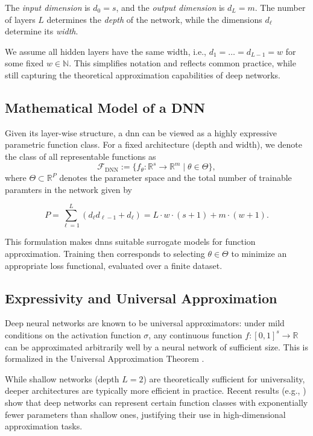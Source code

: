The \emph{input dimension} is $d_0 = s$, and the \emph{output dimension} is $d_L
= m$. The number of layers $L$ determines the \emph{depth} of the network, while
the dimensions $d_\ell$ determine its \emph{width}.

\begin{remark}
We assume all hidden layers have the same width, i.e., $d_1 = \dots = d_{L-1} =
w$ for some fixed $w \in \mathbb{N}$. This simplifies notation and reflects
common practice, while still capturing the theoretical approximation
capabilities of deep networks.
\end{remark}


\subsection{Mathematical Model of a DNN}
\label{subsec:dnn-model}

Given its layer-wise structure, a  \ac{dnn} can be viewed as a highly expressive parametric function class. For a fixed architecture (depth and width), we denote the class of all representable functions as
\begin{equation*}
    \mathcal{F}_{\mathrm{DNN}} := \{ f_\theta : \mathbb{R}^s \to \mathbb{R}^m \mid \theta \in \Theta \},
\end{equation*}
where $\Theta \subset \mathbb{R}^P$ denotes the parameter space and the total number of trainable paramters in the network given by

\begin{equation*}
  P = \sum_{\ell=1}^L (d_\ell d_{\ell-1} + d_\ell) = L \cdot w \cdot (s + 1) + m \cdot (w + 1).
\end{equation*}

This formulation makes  \acp{dnn} suitable surrogate models for function approximation. Training then corresponds to selecting $\theta \in \Theta$ to minimize an appropriate loss functional, evaluated over a finite dataset.

\subsection{Expressivity and Universal Approximation}
\label{subsec:universal-approx}

Deep neural networks are known to be universal approximators: under mild
conditions on the activation function $\sigma$, any continuous function $f
\colon [0,1]^s \to \mathbb{R}$ can be approximated arbitrarily well by a neural
network of sufficient size. This is formalized in the Universal Approximation
Theorem \cite[Theorem 2]{cybenko1989approximation}.

While shallow networks (depth $L=2$) are theoretically sufficient for
universality, deeper architectures are typically more efficient in practice.
Recent results (e.g., \cite{telgarsky2016benefits, yarotsky2017error}) show that
deep networks can represent certain function classes with exponentially fewer
parameters than shallow ones, justifying their use in high-dimensional
approximation tasks.
